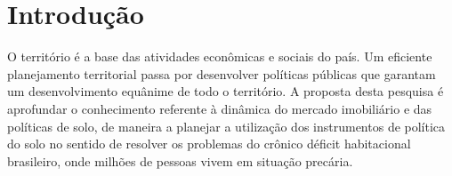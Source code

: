 \documentclass[
	12pt,				%
	oneside,			%
	a4paper,			%
	chapter=TITLE,		%
	section=TITLE,		%
	english,			%
	brazil				%
	]{abntex2}
\begin{document}
% 
%
%  

{%
	\hypersetup{hidelinks}
	\listoffigures*
	\cleardoublepage
	
	\listofquadros*
	\cleardoublepage
	
	\listoftables*
	\cleardoublepage
	
	\imprimirlistadesiglas
	
	\imprimirlistadesimbolos
	
	\tableofcontents*
	\cleardoublepage
	
}%


\textual

\hypertarget{intro}{%
\chapter{Introdução}\label{intro}}

O território é a base das atividades econômicas e sociais do país. Um eficiente
planejamento territorial passa por desenvolver políticas públicas que garantam
um desenvolvimento equânime de todo o território. A proposta desta pesquisa é
aprofundar o conhecimento referente à dinâmica do mercado imobiliário e das
políticas de solo, de maneira a planejar a utilização dos instrumentos de
política do solo no sentido de resolver os problemas do crônico déficit
habitacional brasileiro, onde milhões de pessoas vivem em situação precária.
\end{document}
